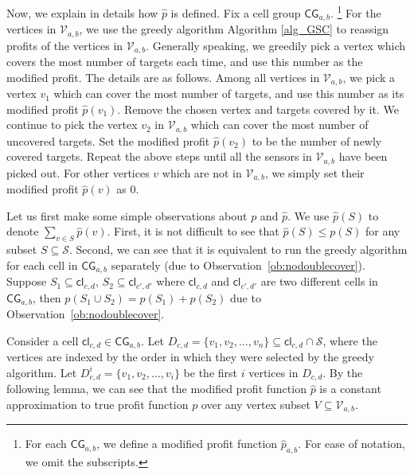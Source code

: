 \documentclass[11pt]{article}
\newcommand{\calV}{{\mathcal V}}
\newcommand{\calS}{{\mathcal S}}
\newcommand{\hp}{\widehat{p}}
\newcommand{\cell}{\mathsf{cl}}
\newcommand{\cells}{\mathsf{CG}}
\begin{document}
Now, we explain in details how $\hp$ is defined.
Fix a cell group $\cells_{a,b}$.
\footnote{
	For each $\cells_{a,b}$, we define a modified profit function $\hp_{a,b}$.
	For ease of notation, we omit the subscripts.
}
For the vertices in $\calV_{a,b}$, we use the greedy algorithm Algorithm \ref{alg_GSC}
to reassign profits of the vertices in $\calV_{a,b}$. Generally speaking, we greedily pick a vertex which covers the most number of targets each time, and use this number as the modified profit. The details are as follows.
Among all vertices in $\calV_{a,b}$,
we pick a vertex $v_1$ which can cover the most number of targets,
and use this number as its modified profit $\hp(v_1)$.
Remove the chosen vertex and targets covered by it.
We continue to pick the vertex $v_2$ in $\calV_{a,b}$ which can cover the most number of uncovered targets.
Set the modified profit $\hp(v_2)$ to be the number of newly covered targets.
Repeat the above steps until all the sensors in $\calV_{a,b}$ have been picked out.
For other vertices $v$ which are not in $\calV_{a,b}$, we simply set their modified profit $\hp(v)$ as 0.

Let us first make some simple observations about $p$ and $\hp$.
We use $\hp(S)$ to denote $\sum_{v\in S}\hp(v)$.
First, it is not difficult to see that $\hp(S)\leq p(S)$ for any subset $S\subseteq\calS$.
Second, we can see that it is equivalent to run the greedy algorithm for
each cell in $\cells_{a,b}$ separately (due to Observation~\ref{ob:nodoublecover}).
Suppose $S_1\subseteq \cell_{c,d}$,
$S_2\subseteq \cell_{c',d'}$ where $\cell_{c,d}$ and $\cell_{c',d'}$ are two different cells in $\cells_{a,b}$,
then $p(S_1\cup S_2)=p(S_1)+p(S_2)$ due to Observation~\ref{ob:nodoublecover}.


Consider a cell $\cell_{c,d}\in \cells_{a,b}$.
Let $D_{c,d} = \{v_1, v_2, ... ,v_n\}\subseteq \cell_{c,d}\cap \calS$,
where the vertices are indexed by the order
in which they were selected by the greedy algorithm.
Let $D_{c,d}^{i} = \{v_1, v_2, ... , v_i\}$ be the first $i$ vertices in $D_{c,d}$.
By the following lemma, we can see that the modified profit function $\hp$ is a constant approximation to
true profit function $p$ over any vertex subset $V\subseteq \calV_{a,b}$.
\end{document}

